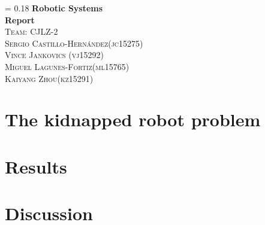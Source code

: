 \documentclass[12pt,a4paper]{article}
\newcommand{\ass}{Robotic Systems\\ Report}
\newcommand{\name}{ Team: CJLZ-2\\Sergio Castillo-Hernández(jc15275)\\ Vince Jankovics (vj15292)\\ Miguel Lagunes-Fortiz(ml15765)\\ Kaiyang Zhou(kz15291)}
\newcommand*{\titleM}{
\thispagestyle{empty}
\newlength{\drop}
\begingroup%


\drop = 0.18\textheight
\centering
\vspace*{\drop}
\vspace*{\drop}
{\Huge\bfseries \ass}\\[\baselineskip]
{\large\scshape \name}\par
\vfill
\endgroup

\thispagestyle{empty}
\makebox[\textwidth]{}
\pagebreak
\makebox[\textwidth]{}
\setcounter{page}{0}
}
\begin{document}
	\titleM
	
	
		
	 \label{sec:robot}
	
	
		
	\section{The kidnapped robot problem} \label{sec:method}
		
		
		
		
		
		
 	
 	\section{Results} \label{sec:result}
 	
 		
 		
		
 		
 	\section{Discussion} \label{sec:discuss}
 
 
 
 \printbibliography
 
 
 		 	
	 	
\end{document}
